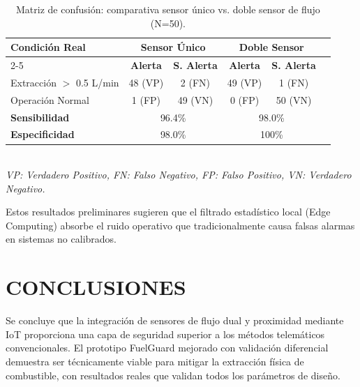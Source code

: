 \documentclass[twocolumn, 10pt]{article}
\begin{document}
\vspace{0.2cm}
\begin{table}[H]
\centering
{\fontsize{8}{10}\selectfont
\caption{Matriz de confusión: comparativa sensor único vs. doble sensor de flujo (N=50).}
\begin{tabular}{lccccc}
\hline
\textbf{Condición Real} & \multicolumn{2}{c}{\textbf{Sensor Único}} & \multicolumn{2}{c}{\textbf{Doble Sensor}} \\ \cline{2-5}
& \textbf{Alerta} & \textbf{S. Alerta} & \textbf{Alerta} & \textbf{S. Alerta} \\ \hline
Extracción $>$ 0.5 L/min & 48 (VP) & 2 (FN) & 49 (VP) & 1 (FN) \\
Operación Normal & 1 (FP) & 49 (VN) & 0 (FP) & 50 (VN) \\ \hline
\textbf{Sensibilidad} & \multicolumn{2}{c}{96.4\%} & \multicolumn{2}{c}{98.0\%} \\
\textbf{Especificidad} & \multicolumn{2}{c}{98.0\%} & \multicolumn{2}{c}{100\%} \\ \hline
\end{tabular}
\\[4pt]
\textit{VP: Verdadero Positivo, FN: Falso Negativo, FP: Falso Positivo, VN: Verdadero Negativo.}
}
\end{table}
\vspace{0.2cm}

Estos resultados preliminares sugieren que el filtrado estadístico local (Edge Computing) absorbe el ruido operativo que tradicionalmente causa falsas alarmas en sistemas no calibrados.

\section*{CONCLUSIONES}

Se concluye que la integración de sensores de flujo dual y proximidad mediante IoT proporciona una capa de seguridad superior a los métodos telemáticos convencionales. El prototipo FuelGuard mejorado con validación diferencial demuestra ser técnicamente viable para mitigar la extracción física de combustible, con resultados reales que validan todos los parámetros de diseño.
\end{document}
